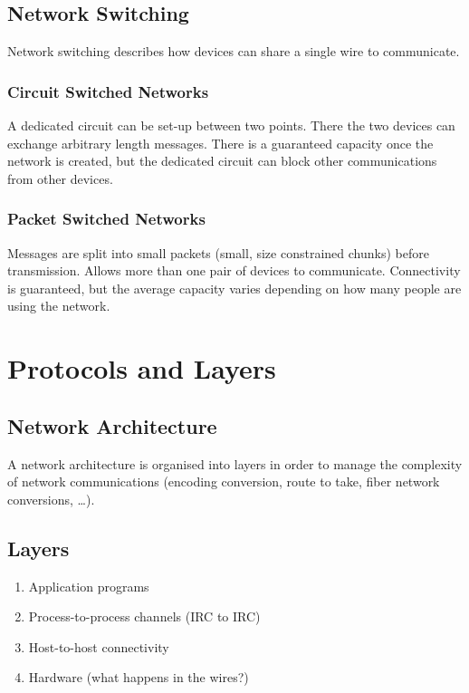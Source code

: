 \subsection{Network Switching}\label{sub:network_switching}

Network switching describes how devices can share a single wire to communicate.

\subsubsection{Circuit Switched Networks}\label{ssub:circuit_switched_networks}

A dedicated circuit can be set-up between two points.
There the two devices can exchange arbitrary length messages.
There is a guaranteed capacity once the network is created, but the dedicated circuit can block other communications from other devices.

\subsubsection{Packet Switched Networks}\label{ssub:packet_switched_networks}

Messages are split into small packets (small, size constrained chunks) before transmission.
Allows more than one pair of devices to communicate.
Connectivity is guaranteed, but the average capacity varies depending on how many people are using the network.

\section{Protocols and Layers}\label{sec:protocols_and_layers}

\subsection{Network Architecture}\label{sub:network_architecture}

A network architecture is organised into layers in order to manage the complexity of network communications (encoding conversion, route to take, fiber network conversions, \dots).

\subsection{Layers}\label{sub:layers}

\begin{enumerate}
    \item Application programs
    \item Process-to-process channels (IRC to IRC)
    \item Host-to-host connectivity
    \item Hardware (what happens in the wires?)
\end{enumerate}

